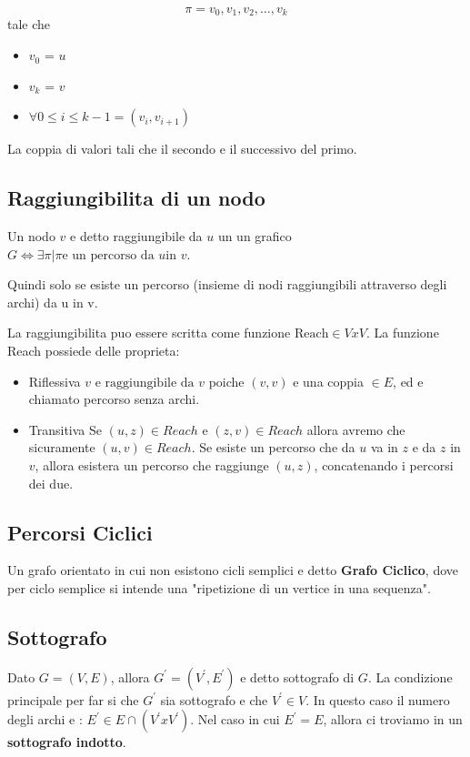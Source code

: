 $$\pi = v_0,v_1,v_2,\dots,v_k$$ tale che 

\begin{itemize}
	\item $v_0$ = $u$
	\item $v_k$ = $v$
	\item $\forall  0\le i \le k-1 = (v_i,v_{i+1})$
\end{itemize}

La coppia di valori tali che il secondo e il successivo del primo.

\subsection{Raggiungibilita di un nodo}

Un nodo $v $ e detto raggiungibile da $u$ un un grafico $G \iff \exists \pi | \pi \text{e un percorso da }u \text{in } v$.

Quindi solo se esiste un percorso (insieme di nodi raggiungibili attraverso degli archi) da u in v.

La raggiungibilita puo essere scritta come funzione $\text{Reach} \in V x V$. La funzione Reach possiede delle proprieta:
\begin{itemize}
	\item Riflessiva
			$v \text{ e raggiungibile da } v$ poiche $(v,v)$ e una coppia $\in E$, ed e chiamato percorso senza archi. 
	\item Transitiva
			Se $(u,z) \in Reach$ e $(z,v) \in Reach$ allora avremo che sicuramente $(u,v) \in Reach$.
			Se esiste un percorso che da $u$ va in $z$ e da $z$ in $v$, allora esistera un percorso che raggiunge $(u,z)$, concatenando i percorsi dei due.
\end{itemize}  

\subsection{Percorsi Ciclici}
Un grafo orientato in cui non esistono cicli semplici e detto \textbf{Grafo Ciclico}, dove per ciclo semplice si intende una "ripetizione di un vertice in una sequenza".


\subsection{Sottografo}
Dato $G = (V,E)$, allora $G^{\prime} = (V^{\prime},E^{\prime})$ e detto sottografo di $G$.
La condizione principale per far si che $G^{\prime}$ sia sottografo e che $V^{\prime} \in V$.
In questo caso il numero degli archi e : $E^{\prime} \in E \cap (V^{\prime} x V^{\prime})$.
Nel caso in cui $E^{\prime} = E$, allora ci troviamo in un \textbf{sottografo indotto}.



